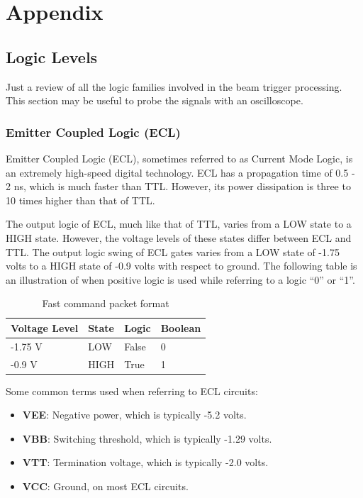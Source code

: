 \chapter{Appendix}

\section{Logic Levels}
Just a review of all the logic families involved in the beam trigger processing.
This section may be useful to probe the signals with an oscilloscope.
\subsection{Emitter Coupled Logic (ECL)}\label{sec:emitt-coupl-logic}
Emitter Coupled Logic (ECL), sometimes referred to as Current Mode Logic, is an
extremely high-speed digital technology. ECL has a propagation time of 0.5 - 2
ns, which is much faster than TTL. However, its power dissipation is three to 10
times higher than that of TTL.

The output logic of ECL, much like that of TTL, varies from a LOW state to a
HIGH state. However, the voltage levels of these states differ between ECL and
TTL. The output logic swing of ECL gates varies from a LOW state of -1.75 volts
to a HIGH state of -0.9 volts with respect to ground. The following table is an
illustration of when positive logic is used while referring to a logic ``0'' or
``1''.
\begin{table}[H]
  \centering
  \begin{tabular}{l l l l}
    \hline
    \textbf{Voltage Level} & \textbf{State} & \textbf{Logic} & \textbf{Boolean}
    \\
    \hline
    -1.75 V & LOW & False & 0 \\
    -0.9 V & HIGH & True & 1 \\
    \hline
  \end{tabular}
  \caption{Fast command packet format}
\end{table}

Some common terms used when referring to ECL circuits:
\begin{itemize}
\item \textbf{VEE}: Negative power, which is typically -5.2 volts.
\item \textbf{VBB}: Switching threshold, which is typically -1.29 volts.
\item \textbf{VTT}: Termination voltage, which is typically -2.0 volts.
\item \textbf{VCC}: Ground, on most ECL circuits.
\end{itemize}

